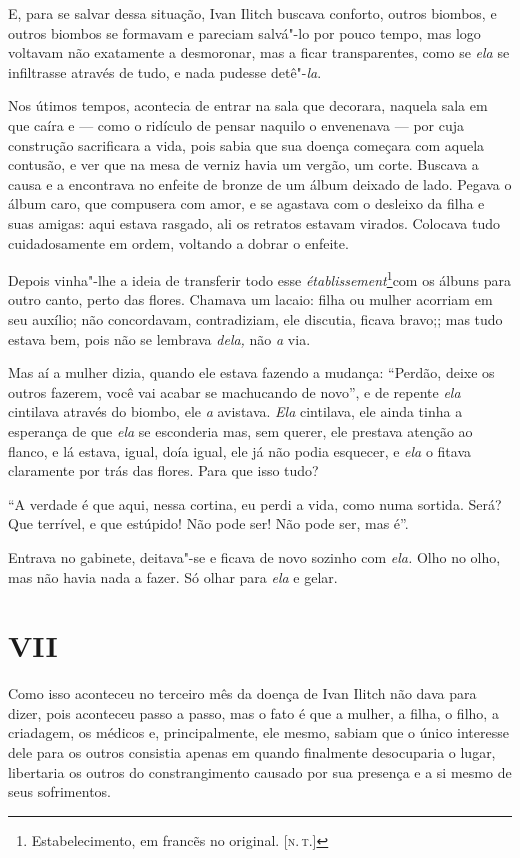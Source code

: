 E, para se salvar dessa situação, Ivan Ilitch buscava conforto, outros
biombos, e outros biombos se formavam e pareciam salvá"-lo por pouco
tempo, mas logo voltavam não exatamente a desmoronar, mas a ficar
transparentes, como se \emph{ela} se infiltrasse através de tudo, e nada
pudesse detê"-\emph{la}.

Nos útimos tempos, acontecia de entrar na sala que decorara, naquela
sala em que caíra e --- como o ridículo de pensar naquilo o envenenava ---
por cuja construção sacrificara a vida, pois sabia que sua doença
começara com aquela contusão, e ver que na mesa de verniz havia um
vergão, um corte. Buscava a causa e a encontrava no enfeite de bronze de
um álbum deixado de lado. Pegava o álbum caro, que compusera com amor, e
se agastava com o desleixo da filha e suas amigas: aqui estava rasgado,
ali os retratos estavam virados. Colocava tudo cuidadosamente em ordem,
voltando a dobrar o enfeite.

Depois vinha"-lhe a ideia de transferir todo esse
\emph{établissement}\footnote{Estabelecimento, em francẽs no original.
  {[}\textsc{n.\,t.}{]}}com os álbuns para outro canto, perto das flores. Chamava
um lacaio: filha ou mulher acorriam em seu auxílio; não concordavam,
contradiziam, ele discutia, ficava bravo;; mas tudo estava bem, pois não
se lembrava \emph{dela,} não \emph{a} via.

Mas aí a mulher dizia, quando ele estava fazendo a mudança: ``Perdão,
deixe os outros fazerem, você vai acabar se machucando de novo'', e de
repente \emph{ela} cintilava através do biombo, ele \emph{a} avistava.
\emph{Ela} cintilava, ele ainda tinha a esperança de que \emph{ela} se
esconderia mas, sem querer, ele prestava atenção ao flanco, e lá estava,
igual, doía igual, ele já não podia esquecer, e \emph{ela} o fitava
claramente por trás das flores. Para que isso tudo?

``A verdade é que aqui, nessa cortina, eu perdi a vida, como numa
sortida. Será? Que terrível, e que estúpido! Não pode ser! Não pode ser,
mas é''.

Entrava no gabinete, deitava"-se e ficava de novo sozinho com \emph{ela.}
Olho no olho, mas não havia nada a fazer. Só olhar para \emph{ela} e
gelar.

\section*{VII}

Como isso aconteceu no terceiro mês da doença de Ivan Ilitch não dava
para dizer, pois aconteceu passo a passo, mas o fato é que a mulher, a
filha, o filho, a criadagem, os médicos e, principalmente, ele mesmo,
sabiam que o único interesse dele para os outros consistia apenas em
quando finalmente desocuparia o lugar, libertaria os outros do
constrangimento causado por sua presença e a si mesmo de seus
sofrimentos.

